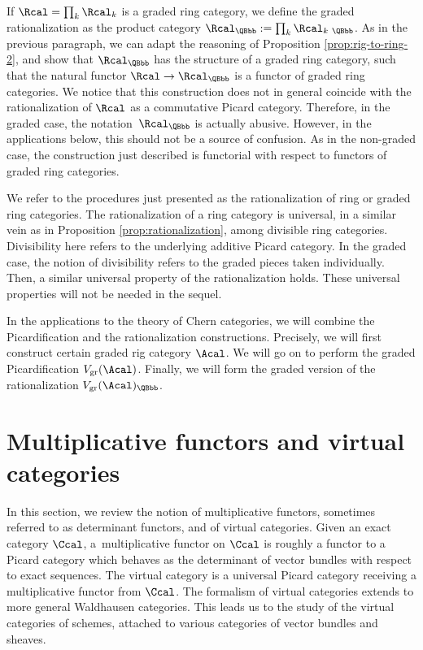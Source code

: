 If $\Rcal=\prod_{k}\Rcal_{k}$ is a graded ring category, we define the graded rationalization as the product category $\Rcal_{\QBbb}:=\prod_{k}\Rcal_{k\ \QBbb}$. As in the previous paragraph, we can adapt the reasoning of Proposition \ref{prop:rig-to-ring-2}, and show that $\Rcal_{\QBbb}$ has the structure of a graded ring category, such that the natural functor $\Rcal\to\Rcal_{\QBbb}$ is a functor of graded ring categories. We notice that this construction does not in general coincide with the rationalization of $\Rcal$ as a commutative Picard category. Therefore, in the graded case, the notation~$\Rcal_{\QBbb}$ is actually abusive. However, in the applications below, this should not be a source of confusion. As in the non-graded case, the construction just described is functorial with respect to functors of graded ring categories.

We refer to the procedures just presented as the rationalization of ring or graded ring categories. The rationalization of a ring category is universal, in a similar vein as in Proposition \ref{prop:rationalization}, among divisible ring categories. Divisibility here refers to the underlying additive Picard category. In the graded case, the notion of divisibility refers to the graded pieces taken individually. Then, a similar universal property of the rationalization holds. These universal properties will not be needed in the sequel.

In the applications to the theory of Chern categories, we will combine the Picardification and the rationalization constructions. Precisely, we will first construct certain graded rig category $\Acal$. We will go on to perform the graded Picardification $V_{\mathrm{gr}}(\Acal)$. Finally, we will form the graded version of the rationalization $V_{\mathrm{gr}}(\Acal)_{\QBbb}$.

\section{Multiplicative functors and virtual categories}\label{sec:multiplicative-functors-virtual-categories}
In this section, we review the notion of multiplicative functors, sometimes referred to as determinant functors, and of virtual categories. Given an exact category $\Ccal$, a~multiplicative functor on $\Ccal$ is roughly a functor to a Picard category which behaves as the determinant of vector bundles with respect to exact sequences. The virtual category is a universal Picard category receiving a multiplicative functor from $\Ccal$. The formalism of virtual categories extends to more general Waldhausen categories. This leads us to the study of the virtual categories of schemes, attached to various categories of vector bundles and sheaves.


